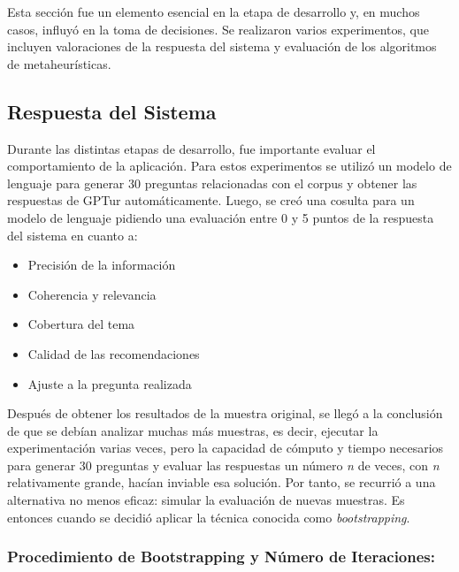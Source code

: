 \documentclass[10pt]{llncs}
\begin{document}
\vspace{\baselineskip}



Esta sección fue un elemento esencial en la etapa de desarrollo y, en muchos casos, influyó en la toma de decisiones. Se realizaron varios experimentos, que incluyen valoraciones de la respuesta del sistema y evaluación de los algoritmos de metaheurísticas.

\vspace{\baselineskip}
\subsection{Respuesta del Sistema}

Durante las distintas etapas de desarrollo, fue importante evaluar el comportamiento de la aplicación. Para estos experimentos se utilizó un modelo de lenguaje para generar 30 preguntas relacionadas con el corpus y obtener las respuestas de GPTur automáticamente. Luego, 
se creó una cosulta para un modelo de lenguaje pidiendo una evaluación entre 0 y 5 puntos de la respuesta del sistema en cuanto a:
\begin{itemize}
    \item  Precisión de la información
    \item Coherencia y relevancia
    \item Cobertura del tema
    \item Calidad de las recomendaciones
    \item Ajuste a la pregunta realizada
\end{itemize}

Después de obtener los resultados de la muestra original, se llegó a la conclusión de que se debían analizar muchas más muestras, es decir, ejecutar la experimentación varias veces, pero la capacidad de cómputo y tiempo necesarios para generar 30 preguntas y evaluar las respuestas un número \textit{n} de veces, con \textit{n} relativamente 
grande, hacían inviable esa solución. Por tanto, se recurrió a una alternativa no menos eficaz: simular la evaluación de nuevas muestras. Es entonces cuando se decidió aplicar la técnica conocida como \textit{bootstrapping}.

\subsubsection{Procedimiento de Bootstrapping y Número de Iteraciones:}
\end{document}
